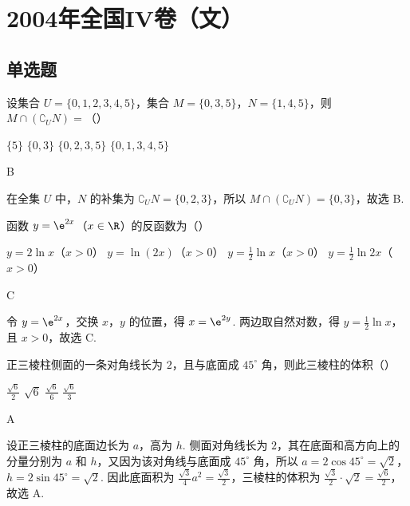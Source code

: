 \chapter{2004年全国IV卷（文）}
\section{单选题}
\begin{problem}
设集合 \(U = \{0, 1, 2, 3, 4, 5\}\)，集合 \(M = \{0, 3, 5\}\)，\(N = \{1, 4, 5\}\)，则 \(M \cap (\complement_U N) =\)（\quad）

\choices
    {\(\{5\}\)}
    {\(\{0,3\}\)}
    {\(\{0, 2, 3, 5\}\)}
    {\(\{0, 1, 3, 4, 5\}\)}
\end{problem}

\begin{answer}
B
\end{answer}

\begin{solution}
在全集 \(U\) 中，\(N\) 的补集为 \(\complement_U N=\{0,2,3\}\)，所以 \(M\cap(\complement_U N)=\{0,3\}\)，故选 B.
\end{solution}

\begin{problem}
函数 \(y = \e^{2x}\)（\(x \in \R\)）的反函数为（\quad）

\choices
    {\(y = 2\ln x\)（\(x > 0\)）}
    {\(y = \ln(2x)\)（\(x > 0\)）}
    {\(y = \frac{1}{2}\ln x\)（\(x > 0\)）}
    {\(y = \frac{1}{2}\ln 2x\)（\(x > 0\)）}
\end{problem}

\begin{answer}
C
\end{answer}

\begin{solution}
令 \(y=\e^{2x}\)，交换 \(x\)，\(y\) 的位置，得 \(x=\e^{2y}\). 两边取自然对数，得 \(y=\frac{1}{2}\ln x\)，且 \(x>0\)，故选 C.
\end{solution}

\begin{problem}
正三棱柱侧面的一条对角线长为 \(2\)，且与底面成 \(45^{\circ}\) 角，则此三棱柱的体积（\quad）

\choices
    {\(\frac{\sqrt{6}}{2}\)}
    {\(\sqrt{6}\)}
    {\(\frac{\sqrt{6}}{6}\)}
    {\(\frac{\sqrt{6}}{3}\)}
\end{problem}

\begin{answer}
A
\end{answer}

\begin{solution}
设正三棱柱的底面边长为 \(a\)，高为 \(h\). 侧面对角线长为 \(2\)，其在底面和高方向上的分量分别为 \(a\) 和 \(h\)，又因为该对角线与底面成 \(45^{\circ}\) 角，所以 \(a=2\cos45^{\circ}=\sqrt{2}\)，\(h=2\sin45^{\circ}=\sqrt{2}\). 因此底面积为 \(\frac{\sqrt{3}}{4}a^2=\frac{\sqrt{3}}{2}\)，三棱柱的体积为 \(\frac{\sqrt{3}}{2}\cdot\sqrt{2}=\frac{\sqrt{6}}{2}\)，故选 A.
\end{solution}


